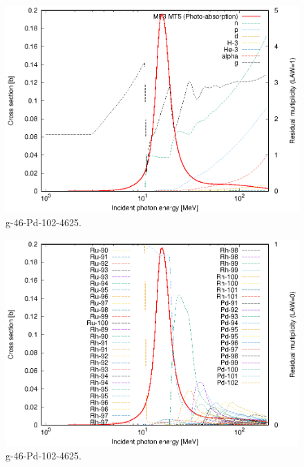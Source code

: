 \begin{figure}
 \includegraphics[width=\linewidth]{eps/g_46-Pd-102_4625.eps}
  \caption{g-46-Pd-102-4625.}
\end{figure}
\begin{figure}
 \includegraphics[width=\linewidth]{eps-law0/g_46-Pd-102_4625.eps}
 \caption{g-46-Pd-102-4625.}
\end{figure}
\newpage \clearpage

